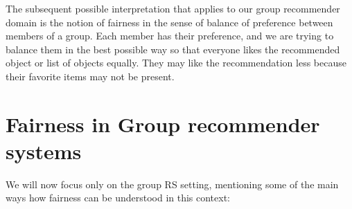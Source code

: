 The subsequent possible interpretation that applies to our group recommender domain is the notion of fairness in the sense of balance of preference between members of a group. Each member has their preference, and we are trying to balance them in the best possible way so that everyone likes the recommended object or list of objects equally. They may like the recommendation less because their favorite items may not be present.












\section{Fairness in Group recommender systems} \label{sec:02_fairness_in_grs}





We will now focus only on the group RS setting, mentioning some of the main ways how fairness can be understood in this context:


